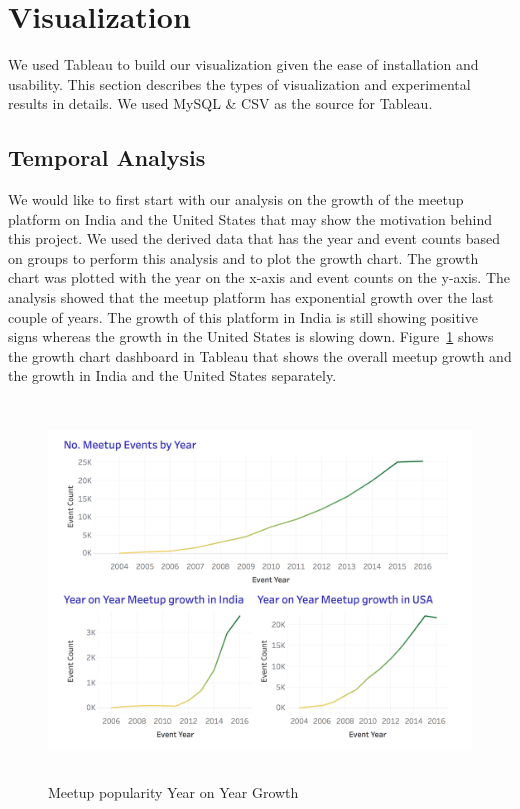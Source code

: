 \documentclass{acm_proc_article-sp}
\begin{document}
\section{Visualization}
We used Tableau to build our visualization given the ease of installation and usability.  This section describes the types of visualization and experimental results in details.  We used MySQL \& CSV as the source for Tableau.

\subsection{Temporal Analysis}
We would like to first start with our analysis on the growth of the meetup platform on India and the United States that may show the motivation behind this project.  We used the derived data that has the year and event counts based on groups to perform this analysis and to plot the growth chart.  The growth chart was plotted with the year on the x-axis and event counts on the y-axis.  The analysis showed that the meetup platform has exponential growth over the last couple of years.  The growth of this platform in India is still showing positive signs whereas the growth in the United States is slowing down.  Figure~\ref{F: meetupgrowth} shows the growth chart dashboard in Tableau that shows the overall meetup growth and the growth in India and the United States separately.
\begin{figure}[p]
  \centering
      \includegraphics[width=0.9\linewidth,height=10cm]{images/tableau_images/year_on_year_growth-dashboard.png}
  \caption{Meetup popularity Year on Year Growth}\label{F: meetupgrowth}
\end{figure}
\end{document}
